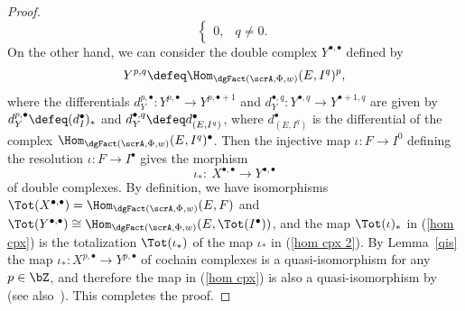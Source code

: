 \begin{lem}
\begin{proof}
\begin{equation*}
\begin{cases}
0,& q\neq 0.
\end{cases}
\end{equation*}
On the other hand, we can consider the double complex $Y^{\bullet,\bullet}$ defined by
\begin{equation*}
Y^{p,q}\defeq\Hom_{\dgFact(\scrA,\Phi,w)}(E,I^q)^p,
\end{equation*}
 where the differentials $d_Y^{p,\bullet}\colon Y^{p,\bullet}\to Y^{p,\bullet+1}$ and $d_Y^{\bullet,q}\colon Y^{\bullet,q}\to Y^{\bullet+1,q}$ are given by $d_Y^{p,\bullet}\defeq (d_I^{\bullet})_*$ and $d_Y^{\bullet,q}\defeq d_{(E,I^q)}^{\bullet}$, where $d_{(E,I^q)}^{\bullet}$ is the differential of the complex $\Hom_{\dgFact(\scrA,\Phi,w)}(E,I^{q})^{\bullet}$. Then the injective map $\iota\colon F\to I^0$ defining the resolution $\iota\colon F\to I^{\bullet}$ gives the morphism
 \begin{equation}\label{hom cpx 2}
 \iota_*\colon\ X^{\bullet,\bullet}\to Y^{\bullet,\bullet}
 \end{equation}
 of double complexes. By definition, we have isomorphisms $\Tot(X^{\bullet,\bullet})=\Hom_{\dgFact(\scrA,\Phi,w)}(E,F)$ and $\Tot(Y^{\bullet,\bullet})\cong\Hom_{\dgFact(\scrA,\Phi,w)}(E,\Tot(I^{\bullet}))$, and the map $\Tot(\iota)_*$ in (\ref{hom cpx}) is the totalization $\Tot(\iota_*)$ of the map $\iota_*$ in (\ref{hom cpx 2}).
By Lemma~\ref{qis} the map $\iota_*\colon X^{p,\bullet}\to Y^{p,\bullet}$ of cochain complexes is a quasi-isomorphism for any $p\in \bZ$, and therefore the map in (\ref{hom cpx}) is also a quasi-isomorphism by~\cite[Theorem~1.9.3]{ks} (see also~\cite[Lemma~2.46]{ls}). This completes the proof.
\end{proof}
\end{lem}

